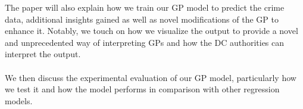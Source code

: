\documentclass[letterpaper]{article}
\begin{document}
	The paper will also explain how we train our GP model to predict the crime data, additional insights gained as well as novel modifications of the GP to enhance it. 
	Notably, we touch on how we visualize the output to provide a novel and unprecedented way of interpreting GPs and how the DC authorities can interpret the output.\\ \\

	We then discuss the experimental evaluation of our GP model, particularly how we test it and how the model performs in comparison with other regression models. 
	


	\printbibliography
\end{document}
